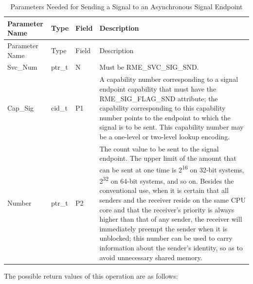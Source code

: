 \begin{xltabular}{\textwidth}{@{}>{\hsize\raggedright\arraybackslash}X>{\hsize\raggedright\arraybackslash}X>{\hsize\raggedright\arraybackslash}X>{\hsize\raggedright\arraybackslash}X@{}}
\caption{Parameters Needed for Sending a Signal to an Asynchronous Signal Endpoint}\label{tab:5-20-send-signal-parameters}\\
\toprule
Parameter Name & Type & Field & Description\tabularnewline
\endfirsthead
\toprule
Parameter Name & Type & Field & Description\tabularnewline
\midrule
\endhead
\bottomrule
\endlastfoot
Svc\_Num & ptr\_t & N & Must be RME\_SVC\_SIG\_SND.\tabularnewline
Cap\_Sig & cid\_t & P1 &
A capability number corresponding to a signal endpoint capability that must have the RME\_SIG\_FLAG\_SND attribute; the capability corresponding to this capability number points to the endpoint to which the signal is to be sent. This capability number may be a one-level or two-level lookup encoding.\tabularnewline
Number & ptr\_t & P2 &
The count value to be sent to the signal endpoint. The upper limit of the amount that can be sent at one time is 2\textsuperscript{16} on 32-bit systems, 2\textsuperscript{32} on 64-bit systems, and so on. Besides the conventional use, when it is certain that all senders and the receiver reside on the same CPU core and that the receiver's priority is always higher than that of any sender, the receiver will immediately preempt the sender when it is unblocked; this number can be used to carry information about the sender's identity, so as to avoid unnecessary shared memory.\tabularnewline
\end{xltabular}
\nopagebreak[4]

\newpage
{}
The possible return values of this operation are as follows:

